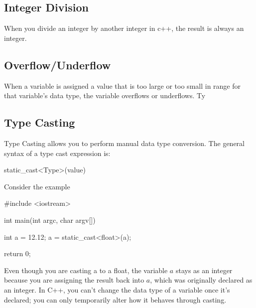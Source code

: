 \documentclass{report}
\begin{document}
    \bigbreak \noindent
    \subsection{Integer Division}
    \bigbreak \noindent 
    \begin{concept}
 When you divide an integer by another integer in c++, the result is always an integer.
	\end{concept}

    \bigbreak \noindent 
    \subsection{Overflow/Underflow}
    \bigbreak \noindent 
    \begin{concept}
 When a variable is assigned a value that is too large or too small in range for that variable's data type, the variable overflows or underflows. Ty
	\end{concept}
    \bigbreak \noindent 
    
    \bigbreak \noindent 
    \subsection{Type Casting}
    \bigbreak \noindent 
    \begin{concept}
 Type Casting allows you to perform manual data type conversion. The general syntax of a type cast expression is:
	\end{concept}
    \bigbreak \noindent 
    
    \begin{cppcode}
static_cast<Type>(value)
    \end{cppcode}
    
    \bigbreak \noindent 
    Consider the example
    \smallbreak \noindent
    
    \begin{cppcode}
#include <iostream>

int main(int argc, char argv[]){
    int a = 12.12;
    a = static_cast<float>(a);

    return 0;
}
    \end{cppcode}
    
    \bigbreak \noindent 
    Even though you are casting a to a float, the variable $a$ stays as an integer because you are assigning the result back into $a$, which was originally declared as an integer. In C++, you can't change the data type of a variable once it's declared; you can only temporarily alter how it behaves through casting.
\end{document}
